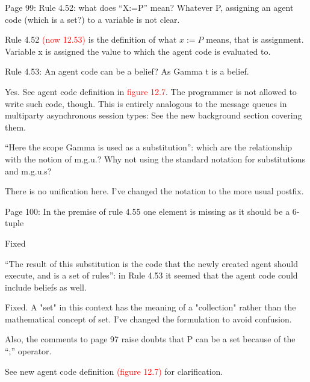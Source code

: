 \documentclass{article}
\newcommand*\R[1]{\textcolor{red}{#1}} %
\newenvironment{them}{\noindent\begingroup\color{blue}}{\endgroup\par}
\begin{document}
\begin{them}

Page 99:
Rule 4.52: what does “X:=P” mean? Whatever P, assigning an agent code (which is
a set?) to a variable is not clear.

\end{them}
Rule 4.52 \R{(now 12.53)} is the definition of what $x:=P$ means, that is
assignment. Variable x is assigned the value to which the agent code is
evaluated to.

\begin{them}

Rule 4.53:
An agent code can be a belief? As Gamma t is a belief.
\end{them}
Yes. See agent code definition in \R{figure 12.7}.
The programmer is not allowed to write such code, though.
This is entirely analogous to the message queues in
  multiparty asynchronous session types:
  See the new background section covering them.

\begin{them}

“Here the scope Gamma is used as a substitution”: which are the relationship
with the notion of m.g.u.? Why not using the standard notation for
substitutions and m.g.u.s?

\end{them}
There is no unification here. I've changed the notation to the more usual
postfix.

\begin{them}

Page 100:
In the premise of rule 4.55 one element is missing as it should be a 6-tuple
\end{them}
Fixed

\begin{them}

“The result of this substitution is the code that the newly created agent
should execute, and is a set of rules”: in Rule 4.53 it seemed that the agent
code could include beliefs as well.

\end{them}
Fixed. A "set" in this context has the meaning of a "collection" rather than
the mathematical concept of set. I've changed the formulation to avoid
confusion.

\begin{them}

Also, the comments to page 97 raise doubts that P can be a set because of the
“;” operator.

\end{them}
See new agent code definition \R{(figure 12.7)} for clarification.
\end{document}
